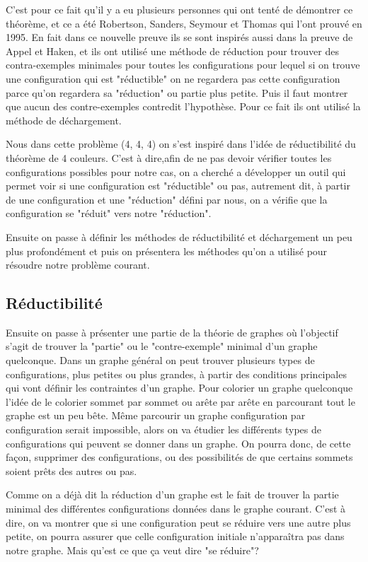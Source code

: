 \documentclass[10pt,a4paper]{article}
\begin{document}
C'est pour ce fait qu'il y a eu plusieurs personnes qui ont tenté de démontrer ce théorème, et ce a été Robertson, Sanders, Seymour et Thomas qui l'ont prouvé en 1995. En fait dans ce nouvelle preuve ils se sont inspirés aussi dans la preuve de Appel et Haken, et ils ont utilisé une méthode de réduction pour trouver des contra-exemples minimales pour toutes les configurations pour lequel si on trouve une configuration qui est "réductible" on ne regardera pas cette configuration parce qu'on regardera sa "réduction" ou partie plus petite. Puis il faut montrer que aucun des contre-exemples contredit l'hypothèse. Pour ce fait ils ont utilisé la méthode de déchargement.

Nous dans cette problème (4, 4, 4) on s'est inspiré dans l'idée de réductibilité du théorème de 4 couleurs. C'est à dire,afin de ne pas devoir vérifier toutes les configurations possibles pour notre cas, on a cherché a développer un outil qui permet voir si une configuration est "réductible" ou pas, autrement dit, à partir de une configuration et une "réduction" défini par nous, on a vérifie que la configuration se "réduit" vers notre "réduction".

Ensuite on passe à définir les méthodes de réductibilité et déchargement un peu plus profondément et puis on présentera les méthodes qu'on a utilisé pour résoudre notre problème courant. 

\subsection{Réductibilité}

Ensuite on passe à présenter une partie de la théorie de graphes où l'objectif s'agit de trouver la "partie" ou le "contre-exemple" minimal d'un graphe quelconque. Dans un graphe général on peut trouver plusieurs types de configurations, plus petites ou plus grandes, à partir des conditions principales qui vont définir les contraintes d'un graphe. Pour colorier un graphe quelconque l'idée de le colorier sommet par sommet ou arête par arête en parcourant tout le graphe est un peu bête. Même parcourir un graphe configuration par configuration serait impossible, alors on va étudier les différents types de configurations qui peuvent se donner dans un graphe. On pourra donc, de cette façon, supprimer des configurations, ou des possibilités de que certains sommets soient prêts des autres ou pas.

Comme on a déjà dit la réduction d'un graphe est le fait de trouver la partie minimal des différentes configurations données dans le graphe courant. C'est à dire, on va montrer que si une configuration peut se réduire vers une autre plus petite, on pourra assurer que celle configuration initiale n'apparaîtra pas dans notre graphe. Mais qu'est ce que ça veut dire "se réduire"?
\end{document}
